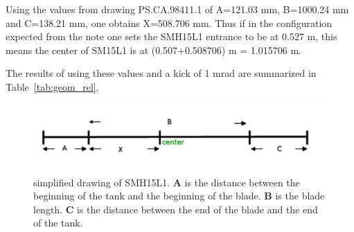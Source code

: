 \documentclass[11pt,letter,english]{article}
\begin{document}
Using the values from drawing PS.CA.98411.1 of A=121.03 mm, B=1000.24 mm and
C=138.21 mm, one obtains X=508.706 mm. Thus if in the configuration expected from
the note one sets the SMH15L1 entrance to be at 0.527 m, this means the center
of SM15L1 is at (0.507+0.508706) m = 1.015706 m.

The results of using these values and a kick of 1 mrad are summarized in Table~\ref{tab:geom_rel}.

\begin{figure}[!hbtp]
  \begin{center}
    \includegraphics[width=1.0\textwidth]{figs/smh15l1.pdf}
    \caption{simplified drawing of SMH15L1. {\bf A} is the distance between the beginning of the tank and the beginning of the blade. {\bf B} is the blade length. 
      {\bf C} is the distance between the end of the blade and the end of the tank.}
    \label{fig:smh15l1_simplified}
  \end{center}
\end{figure}
\end{document}
